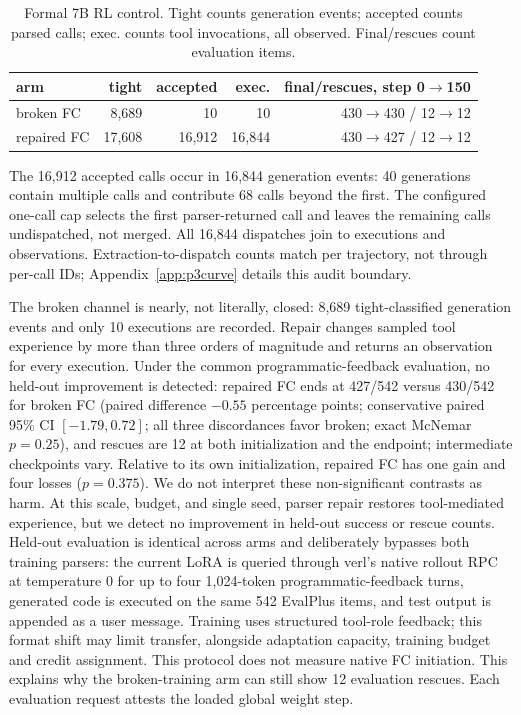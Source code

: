 \begin{table}[H]
\caption{Formal 7B RL control. Tight counts generation events; accepted counts parsed calls; exec. counts tool invocations, all observed. Final/rescues count evaluation items.}
\label{tab:p3formal}
\centering
\small
\begin{tabular}{lrrrr}
\toprule
arm & tight & accepted & exec. & final/rescues, step 0$\to$150 \\
\midrule
broken FC & 8,689 & 10 & 10 & 430$\to$430 / 12$\to$12 \\
repaired FC & 17,608 & 16,912 & 16,844 & 430$\to$427 / 12$\to$12 \\
\bottomrule
\end{tabular}
\end{table}

The 16,912 accepted calls occur in 16,844 generation events: 40 generations contain multiple
calls and contribute 68 calls beyond the first. The configured one-call cap selects the first
parser-returned call and leaves the remaining calls undispatched, not merged. All 16,844
dispatches join to executions and observations. Extraction-to-dispatch counts match per trajectory,
not through per-call IDs; Appendix~\ref{app:p3curve} details this audit boundary.

The broken channel is nearly, not literally, closed: 8,689 tight-classified generation events and
only 10 executions are recorded. Repair changes sampled tool experience by more than three orders of magnitude and returns
an observation for every execution. Under the common programmatic-feedback evaluation, no held-out improvement is detected: repaired FC ends at
427/542 versus 430/542 for broken FC (paired difference $-0.55$ percentage points; conservative
paired 95\% CI $[-1.79,0.72]$; all three discordances favor broken; exact McNemar $p=0.25$), and
rescues are 12 at both initialization and the endpoint; intermediate checkpoints vary. Relative to its own initialization, repaired FC has one gain and four losses
($p=0.375$). We do not interpret these non-significant contrasts as harm. At this scale, budget,
and single seed, parser repair restores tool-mediated experience, but we detect no improvement in
held-out success or rescue counts. Held-out evaluation is identical across arms and deliberately
bypasses both training parsers: the current LoRA is queried through verl's native rollout RPC at
temperature 0 for up to four 1,024-token programmatic-feedback turns, generated code is executed
on the same 542 EvalPlus items, and test output is appended as a user message. Training uses
structured tool-role feedback; this format shift may limit transfer, alongside adaptation
capacity, training budget and credit assignment. This protocol does not measure native FC initiation. This explains why
the broken-training arm can still show 12 evaluation rescues. Each evaluation request attests the
loaded global weight step.

